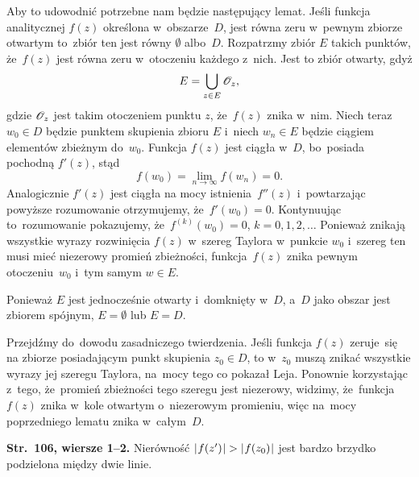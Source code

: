 \documentclass[a4paper,11pt]{article}
\numberwithin{equation}{section}
\begin{document}
Aby to udowodnić potrzebne nam będzie następujący lemat. Jeśli funkcja
analitycznej $f( z )$ określona w~obszarze~$D$, jest równa zeru
w~pewnym zbiorze otwartym to~zbiór ten jest równy $\emptyset$
albo~$D$. Rozpatrzmy zbiór $E$ takich punktów, że~$f( z )$ jest równa
zeru w~otoczeniu każdego z~nich. Jest to zbiór otwarty, gdyż
\begin{equation}
  \label{eq:Leja-Funkcje-zespolone-44}
  E = \bigcup_{ z \in E } \mathcal{O}_{ z },
\end{equation}
gdzie $\mathcal{O}_{ z }$ jest takim otoczeniem punktu $z$, że~$f( z )$
znika w~nim. Niech teraz $w_{ 0 } \in D$ będzie punktem skupienia
zbioru $E$ i~niech $w_{ n } \in E$ będzie ciągiem elementów zbieżnym
do~$w_{ 0 }$. Funkcja $f( z )$ jest ciągła w~$D$, bo~posiada pochodną
$f'( z )$, stąd
\begin{equation}
  \label{eq:Leja-Funkcje-zespolone-45}
  f( w_{ 0 } ) = \lim\limits_{ n \to \infty } f( w_{ n } ) = 0.
\end{equation}
Analogicznie $f'( z )$ jest ciągła na mocy istnienia~$f''( z )$
i~powtarzając powyższe rozumowanie otrzymujemy,
że~$f'( w_{ 0 } ) = 0$. Kontynuując to~rozumowanie pokazujemy,
że~$f^{ ( k ) }( w_{ 0 } ) = 0$, $k = 0, 1, 2, \ldots$ Ponieważ znikają
wszystkie wyrazy rozwinięcia $f( z )$ w~szereg Taylora w~punkcie
$w_{ 0 }$ i~szereg ten musi mieć niezerowy promień zbieżności,
funkcja~$f( z )$ znika pewnym otoczeniu~$w_{ 0 }$ i~tym samym $w \in E$.

Ponieważ $E$ jest jednocześnie otwarty i~domknięty w~$D$, a~$D$ jako
obszar jest zbiorem spójnym, $E = \emptyset$ lub $E = D$.

Przejdźmy do~dowodu zasadniczego twierdzenia. Jeśli funkcja $f( z )$
zeruje~się na zbiorze posiadającym punkt skupienia $z_{ 0 } \in D$, to
w~$z_{ 0 }$ muszą znikać wszystkie wyrazy jej szeregu Taylora, na~mocy
tego co pokazał Leja. Ponownie korzystając z~tego, że~promień
zbieżności tego szeregu jest niezerowy, widzimy, że~funkcja~$f( z )$
znika w~kole otwartym o~niezerowym promieniu, więc na~mocy
poprzedniego lematu znika w~całym~$D$.

\VerSpaceFour





\noindent
\textbf{Str.~106, wiersze 1--2.} Nierówność
$| \hspace{0.05em}  f( z' )  \hspace{0.05em} | > | \hspace{0.05em}  f( z_{ 0 } )  \hspace{0.05em} |$ jest bardzo brzydko
podzielona między dwie linie.

\VerSpaceFour
\end{document}
